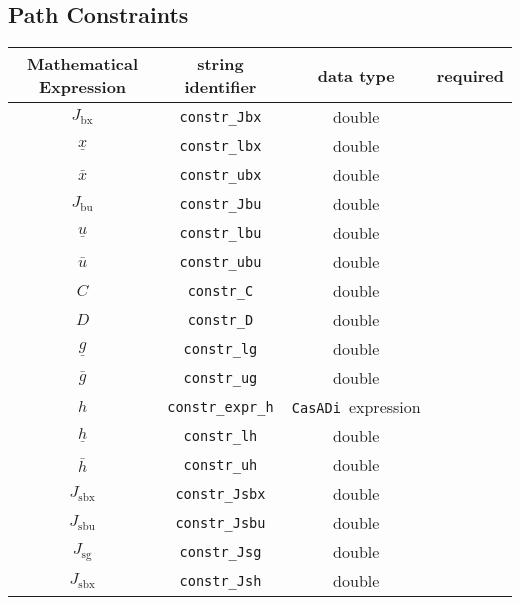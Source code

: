 \documentclass{article}
\newcommand{\code}[1]{\texttt{#1}}
\newcommand{\casadi}{\texttt{CasADi}}
\newcommand{\ind}[1]{_{\textrm{#1}}}
\begin{document}
\subsection{Path Constraints}
\begin{table}[h]
	\centering
	\begin{tabular}{|c|c|c|c|}
		\toprule
		Mathematical Expression & string identifier & data type & required \\ \midrule
		$J_{\textrm{bx}}$ & \code{constr\_Jbx}    & double  & \optional  \\
		$\underline{x} $    & \code{constr\_lbx}     & double  & \optional  \\
		$\bar{x} $  & \code{constr\_ubx}     & double  & \optional   \\ \midrule
		$J_{\textrm{bu}}$ & \code{constr\_Jbu}    & double  & \optional    \\
		$\underline{u} $    & \code{constr\_lbu}     & double   & \optional   \\
		$\bar{u} $         & \code{constr\_ubu}     & double  & \optional   \\ \midrule
		$C$ & \code{constr\_C}    & double  & \optional \\
		$D $    & \code{constr\_D}     & double  & \optional \\
		$\underline{g} $    & \code{constr\_lg}     & double  & \optional    \\
		$\bar{g} $         & \code{constr\_ug}     & double  & \optional   \\ \midrule
		$ h $ & \code{constr\_expr\_h}    & \casadi~expression  & \optional   \\
		$\underline{h} $    & \code{constr\_lh}     & double   & \optional   \\
		$\bar{h} $         & \code{constr\_uh}     & double  & \optional   \\ \midrule
		$ J\ind{sbx} $ & \code{constr\_Jsbx} & double & \optional  \\
		$ J\ind{sbu} $ & \code{constr\_Jsbu} & double  & \optional \\
		$ J\ind{sg} $ & \code{constr\_Jsg} & double & \optional  \\
		$ J\ind{sbx} $ & \code{constr\_Jsh} & double  & \optional  \\
		\bottomrule
	\end{tabular}
\end{table}

\newpage
\end{document}

